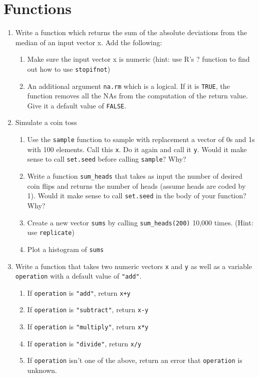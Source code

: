 \documentclass{article}
\begin{document}
\section*{Functions}

\begin{enumerate}

\item Write a function which returns the sum of the absolute deviations from the
median of an input vector x.  Add the following:
    \begin{enumerate}
    \item Make sure the input vector x is numeric
          (hint: use R's ? function to find out how to use \texttt{stopifnot})
    \item An additional argument \texttt{na.rm} which is a logical.  If it is
          \texttt{TRUE}, the function removes all the NAs from the computation
          of the return value.  Give it a default value of \texttt{FALSE}.
    \end{enumerate}

\item Simulate a coin toss
    \begin{enumerate}
    \item Use the \texttt{sample} function to sample with replacement a vector
          of 0s and 1s with 100 elements.  Call this \texttt{x}.  Do it again
          and call it \texttt{y}.  Would it make sense to call \texttt{set.seed}
          before calling \texttt{sample}?  Why?
    \item Write a function \texttt{sum\_heads} that takes as input the number of
          desired coin flips and returns the number of heads (assume heads are
          coded by 1). Would it make sense to call \texttt{set.seed} in the body
          of your function?  Why?
    \item Create a new vector \texttt{sums} by calling \texttt{sum\_heads(200)}
          10,000 times. (Hint: use \texttt{replicate})
    \item Plot a histogram of \texttt{sums}
    \end{enumerate}

\item Write a function that takes two numeric vectors \texttt{x} and \texttt{y}
      as well as a variable \texttt{operation} with a default value of \texttt{"add"}.
    \begin{enumerate}
    \item If \texttt{operation} is \texttt{"add"}, return \texttt{x+y}
    \item If \texttt{operation} is \texttt{"subtract"}, return \texttt{x-y}
    \item If \texttt{operation} is \texttt{"multiply"}, return \texttt{x*y}
    \item If \texttt{operation} is \texttt{"divide"}, return \texttt{x/y}
    \item If \texttt{operation} isn't one of the above, return an error that
          \texttt{operation} is unknown.
    \end{enumerate}


\end{enumerate}
\end{document}
